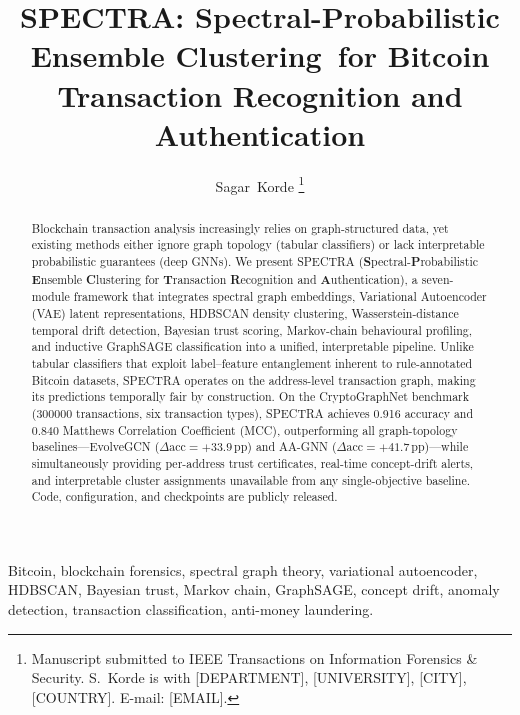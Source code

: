 \documentclass[journal]{IEEEtran}
\newcommand{\spectra}{\textsc{SPECTRA}}
\begin{document}
\title{\spectra: Spectral-Probabilistic Ensemble Clustering\
       for Bitcoin Transaction Recognition and Authentication}

\author{Sagar~Korde%
  \thanks{Manuscript submitted to IEEE Transactions on Information
    Forensics \& Security.
    S.~Korde is with [DEPARTMENT], [UNIVERSITY], [CITY], [COUNTRY].
    E-mail: [EMAIL].}}

\begin{abstract}
Blockchain transaction analysis increasingly relies on graph-structured data,
yet existing methods either ignore graph topology (tabular classifiers) or
lack interpretable probabilistic guarantees (deep GNNs).
We present \spectra{}
(\textbf{S}pectral-\textbf{P}robabilistic \textbf{E}nsemble \textbf{C}lustering
for \textbf{T}ransaction \textbf{R}ecognition and \textbf{A}uthentication),
a seven-module framework that integrates spectral graph embeddings,
Variational Autoencoder (VAE) latent representations, HDBSCAN density
clustering, Wasserstein-distance temporal drift detection, Bayesian trust
scoring, Markov-chain behavioural profiling, and inductive GraphSAGE
classification into a unified, interpretable pipeline.
Unlike tabular classifiers that exploit label--feature entanglement inherent
to rule-annotated Bitcoin datasets, \spectra{} operates on the address-level
transaction graph, making its predictions temporally fair by construction.
On the CryptoGraphNet benchmark (\num{300000} transactions, six transaction
types), \spectra{} achieves \num{0.916} accuracy and \num{0.840} Matthews
Correlation Coefficient (MCC), outperforming all graph-topology
baselines---EvolveGCN ($\Delta\text{acc}={+33.9}$\,pp) and AA-GNN
($\Delta\text{acc}={+41.7}$\,pp)---while simultaneously providing
per-address trust certificates, real-time concept-drift alerts, and
interpretable cluster assignments unavailable from any single-objective
baseline.
Code, configuration, and checkpoints are publicly released.
\end{abstract}

\begin{IEEEkeywords}
Bitcoin, blockchain forensics, spectral graph theory, variational autoencoder,
HDBSCAN, Bayesian trust, Markov chain, GraphSAGE, concept drift, anomaly
detection, transaction classification, anti-money laundering.
\end{IEEEkeywords}

\maketitle
\end{document}
